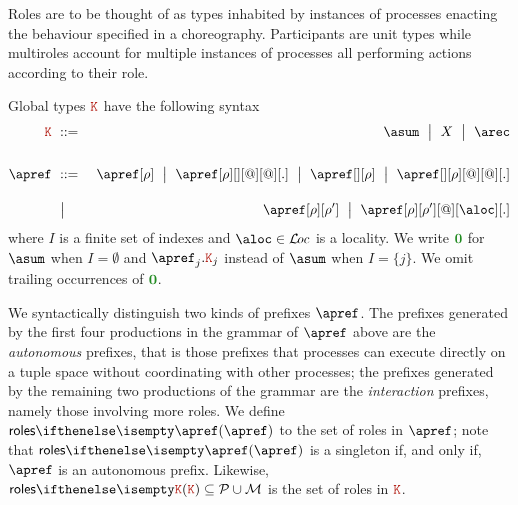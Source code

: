 Roles are to be thought of as types inhabited by instances of
processes enacting the behaviour specified in a choreography.
%
Participants are unit types while multiroles account for multiple
instances of processes all performing actions according to their role.

Global types $\aK$ have the following syntax
\begin{eqnarray*}
  \aK & \bnfdef & \asum \bnfmid
                  X \bnfmid
                  \arec
  \\[1.5em]
  \apref & \bnfdef & \apref[\arole] \bnfmid
                     \apref[\arole][{}][@][@][.] \bnfmid
                     \apref[{}][\arole] \bnfmid
                     \apref[{}][\arole][@][@][.]
  \\[1em]
        & \bnfmid & \apref[\arole][\arole'] \bnfmid
                    \apref[\arole][\arole'][@][\aloc][.]
\end{eqnarray*}
where $I$ is a finite set of indexes and $\aloc \in \locset$ is a
locality.
%
We write $\nil$ for $\asum$ when $I = \emptyset$ and
$\apref_j.\aK_j$ instead of $\asum$ when $I = \{j\}$.
%
We omit trailing occurrences of $\nil$.

We syntactically distinguish two kinds of prefixes $\apref$.
%
The prefixes generated by the first four productions in the grammar of
$\apref$ above are the \emph{autonomous} prefixes, that is those
prefixes that processes can execute directly on a tuple space without
coordinating with other processes; the prefixes generated by the
remaining two productions of the grammar are the \emph{interaction}
prefixes, namely those involving more roles.
%
We define $\roles \apref$ to the set of roles in $\apref$; note that
$\roles \apref$ is a singleton if, and only if, $\apref$ is an
autonomous prefix.
%
Likewise, $\roles \aK \subseteq \participants \cup \multiroles$ is the
set of roles in $\aK$.

